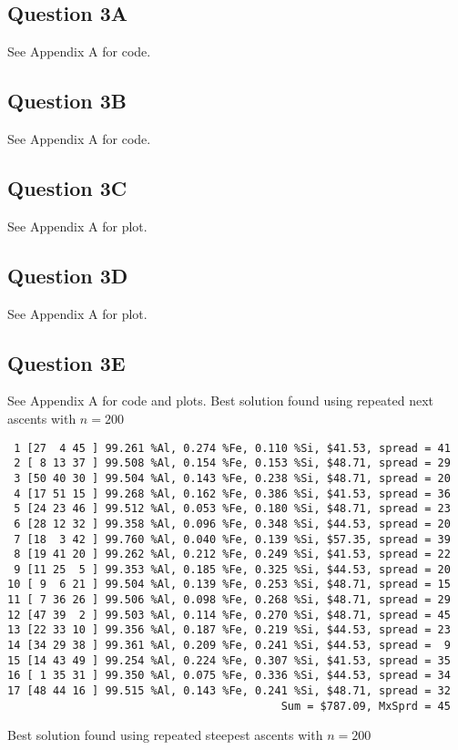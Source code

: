 \documentclass{article}
\begin{document}
\subsection{Question 3A}
See Appendix A for code.
\subsection{Question 3B}
See Appendix A for code.
\subsection{Question 3C}
See Appendix A for plot.
\subsection{Question 3D}
See Appendix A for plot.
\subsection{Question 3E}
See Appendix A for code and plots. Best solution found using repeated next ascents with $n=200$
\begin{verbatim}
 1 [27  4 45 ] 99.261 %Al, 0.274 %Fe, 0.110 %Si, $41.53, spread = 41
 2 [ 8 13 37 ] 99.508 %Al, 0.154 %Fe, 0.153 %Si, $48.71, spread = 29
 3 [50 40 30 ] 99.504 %Al, 0.143 %Fe, 0.238 %Si, $48.71, spread = 20
 4 [17 51 15 ] 99.268 %Al, 0.162 %Fe, 0.386 %Si, $41.53, spread = 36
 5 [24 23 46 ] 99.512 %Al, 0.053 %Fe, 0.180 %Si, $48.71, spread = 23
 6 [28 12 32 ] 99.358 %Al, 0.096 %Fe, 0.348 %Si, $44.53, spread = 20
 7 [18  3 42 ] 99.760 %Al, 0.040 %Fe, 0.139 %Si, $57.35, spread = 39
 8 [19 41 20 ] 99.262 %Al, 0.212 %Fe, 0.249 %Si, $41.53, spread = 22
 9 [11 25  5 ] 99.353 %Al, 0.185 %Fe, 0.325 %Si, $44.53, spread = 20
10 [ 9  6 21 ] 99.504 %Al, 0.139 %Fe, 0.253 %Si, $48.71, spread = 15
11 [ 7 36 26 ] 99.506 %Al, 0.098 %Fe, 0.268 %Si, $48.71, spread = 29
12 [47 39  2 ] 99.503 %Al, 0.114 %Fe, 0.270 %Si, $48.71, spread = 45
13 [22 33 10 ] 99.356 %Al, 0.187 %Fe, 0.219 %Si, $44.53, spread = 23
14 [34 29 38 ] 99.361 %Al, 0.209 %Fe, 0.241 %Si, $44.53, spread =  9
15 [14 43 49 ] 99.254 %Al, 0.224 %Fe, 0.307 %Si, $41.53, spread = 35
16 [ 1 35 31 ] 99.350 %Al, 0.075 %Fe, 0.336 %Si, $44.53, spread = 34
17 [48 44 16 ] 99.515 %Al, 0.143 %Fe, 0.241 %Si, $48.71, spread = 32
                                          Sum = $787.09, MxSprd = 45
\end{verbatim}
Best solution found using repeated steepest ascents with $n=200$
\end{document}
